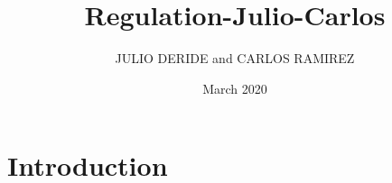 \documentclass{article}
\title{Regulation-Julio-Carlos}
\author{JULIO DERIDE and CARLOS RAMIREZ}
\date{March 2020}
\begin{document}
\maketitle

\section{Introduction}
\end{document}
